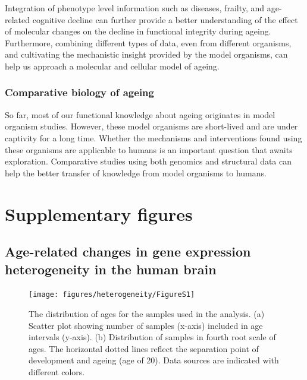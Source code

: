 \documentclass[12pt,twoside]{unicam}
\begin{document}
Integration of phenotype level information such as diseases, frailty, and age-related cognitive decline can further provide a better understanding of the effect of molecular changes on the decline in functional integrity during ageing. Furthermore, combining different types of data, even from different organisms, and cultivating the mechanistic insight provided by the model organisms, can help us approach a molecular and cellular model of ageing.

\hypertarget{comparative-biology-of-ageing}{%
\subsection{Comparative biology of ageing}\label{comparative-biology-of-ageing}}

So far, most of our functional knowledge about ageing originates in model organism studies. However, these model organisms are short-lived and are under captivity for a long time. Whether the mechanisms and interventions found using these organisms are applicable to humans is an important question that awaits exploration. Comparative studies using both genomics and structural data can help the better transfer of knowledge from model organisms to humans.

\appendix

\hypertarget{supplementary-figures}{%
\chapter{Supplementary figures}\label{supplementary-figures}}

\hypertarget{age-related-changes-in-gene-expression-heterogeneity-in-the-human-brain}{%
\section{Age-related changes in gene expression heterogeneity in the human brain}\label{age-related-changes-in-gene-expression-heterogeneity-in-the-human-brain}}

\begin{figure}

{\centering \texttt{[image: figures/heterogeneity/FigureS1]} 

}

\caption[Age distribution of individual datasets,]{The distribution of ages for the samples used in the analysis. (a) Scatter plot showing number of samples (x-axis) included in age intervals (y-axis). (b) Distribution of samples in fourth root scale of ages. The horizontal dotted lines reflect the separation point of development and ageing (age of 20). Data sources are indicated with different colors.}\label{fig:hetFigS1}
\end{figure}
\end{document}
